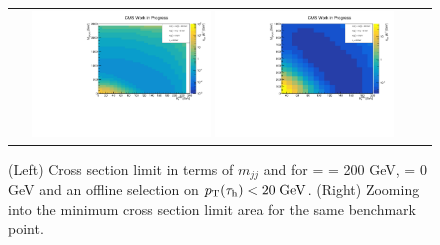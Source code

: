 \begin{figure}[tbh!]
	\centering
	\begin{tabular}{cc}
		\includegraphics[width=0.45\textwidth]{analysis/pics/JetInvMass_vs_MET_xsec_chi200_lsp000_taupt20.pdf}
		\includegraphics[width=0.45\textwidth]{analysis/pics/JetInvMass_vs_MET_xsec_chi200_lsp000_taupt20_zoom.pdf} 		
	\end{tabular}
	\caption{(Left) Cross section limit in terms of $m_{jj}$ and \met for \charginopm = \neutralinotwo = 200 GeV, \neutralinoone = 0 GeV and an offline selection on $p_{\text{T}}(\tau_{\text{h}}) <  20\;\text{Ge}\kern-0.06667em\text{V}$. (Right) Zooming into the minimum cross section limit area for the same benchmark point.}
	\label{fig::JetInvMass_vs_MET_xsec_chi200_lsp000_taupt20}
\end{figure}

